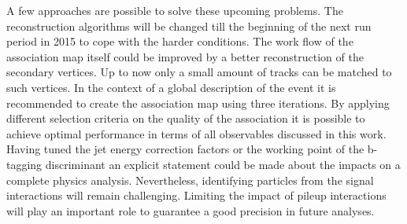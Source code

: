 A few approaches are possible to solve these upcoming problems. The reconstruction algorithms will be changed till the beginning of the next run period in 2015 to cope with the harder conditions. The work flow of the association map itself could be improved by a better reconstruction of the secondary vertices. Up to now only a small amount of tracks can be matched to such vertices.
In the context of a global description of the event it is recommended to create the association map using three iterations. By applying different selection criteria on the quality of the association it is possible to achieve optimal performance in terms of all observables discussed in this work. Having tuned the jet energy correction factors or the working point of the b-tagging discriminant an explicit statement could be made about the impacts on a complete physics analysis.
Nevertheless, identifying particles from the signal interactions will remain challenging. Limiting the impact of pileup interactions will play an important role to guarantee a good precision in future analyses.
